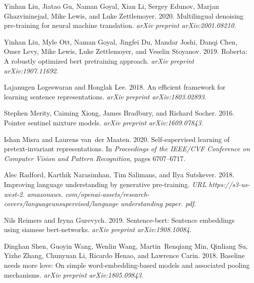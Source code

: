 \documentclass[11pt,a4paper]{article}
\begin{document}
\begin{thebibliography}{32}
Yinhan Liu, Jiatao Gu, Naman Goyal, Xian Li, Sergey Edunov, Marjan
  Ghazvininejad, Mike Lewis, and Luke Zettlemoyer. 2020.
\newblock Multilingual denoising pre-training for neural machine translation.
\newblock \emph{arXiv preprint arXiv:2001.08210}.

Yinhan Liu, Myle Ott, Naman Goyal, Jingfei Du, Mandar Joshi, Danqi Chen, Omer
  Levy, Mike Lewis, Luke Zettlemoyer, and Veselin Stoyanov. 2019.
\newblock Roberta: A robustly optimized bert pretraining approach.
\newblock \emph{arXiv preprint arXiv:1907.11692}.

Lajanugen Logeswaran and Honglak Lee. 2018.
\newblock An efficient framework for learning sentence representations.
\newblock \emph{arXiv preprint arXiv:1803.02893}.

Stephen Merity, Caiming Xiong, James Bradbury, and Richard Socher. 2016.
\newblock Pointer sentinel mixture models.
\newblock \emph{arXiv preprint arXiv:1609.07843}.

Ishan Misra and Laurens van~der Maaten. 2020.
\newblock Self-supervised learning of pretext-invariant representations.
\newblock In \emph{Proceedings of the IEEE/CVF Conference on Computer Vision
  and Pattern Recognition}, pages 6707--6717.

Alec Radford, Karthik Narasimhan, Tim Salimans, and Ilya Sutskever. 2018.
\newblock Improving language understanding by generative pre-training.
\newblock \emph{URL https://s3-us-west-2. amazonaws.
  com/openai-assets/research-covers/languageunsupervised/language understanding
  paper. pdf}.

Nils Reimers and Iryna Gurevych. 2019.
\newblock Sentence-bert: Sentence embeddings using siamese bert-networks.
\newblock \emph{arXiv preprint arXiv:1908.10084}.

Dinghan Shen, Guoyin Wang, Wenlin Wang, Martin~Renqiang Min, Qinliang Su, Yizhe
  Zhang, Chunyuan Li, Ricardo Henao, and Lawrence Carin. 2018.
\newblock Baseline needs more love: On simple word-embedding-based models and
  associated pooling mechanisms.
\newblock \emph{arXiv preprint arXiv:1805.09843}.


\end{thebibliography}
\end{document}
